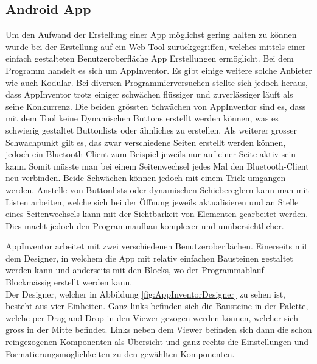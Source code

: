 \subsection{Android App}
\label{subsec:Software_App}

Um den Aufwand der Erstellung einer App möglichst gering halten zu können wurde bei der Erstellung auf ein Web-Tool zurückgegriffen, welches mittels einer einfach gestalteten Benutzeroberfläche App Erstellungen ermöglicht. Bei dem Programm handelt es sich um AppInventor. Es gibt einige weitere solche Anbieter wie auch Kodular. Bei diversen Programmierversuchen stellte sich jedoch heraus, dass AppInventor trotz einiger schwächen flüssiger und zuverlässiger läuft als seine Konkurrenz.  Die beiden grössten Schwächen von AppInventor sind es, dass mit dem Tool keine Dynamischen Buttons erstellt werden können, was es schwierig gestaltet Buttonlists oder ähnliches zu erstellen. Als weiterer grosser Schwachpunkt gilt es, das zwar verschiedene Seiten erstellt werden können, jedoch ein Bluetooth-Client zum Beispiel jeweils nur auf einer Seite aktiv sein kann. Somit müsste man bei einem Seitenwechsel jedes Mal den Bluetooth-Client neu verbinden. Beide Schwächen können jedoch mit einem Trick umgangen werden. Anstelle von Buttonlists oder dynamischen Schiebereglern kann man mit Listen arbeiten, welche sich bei der Öffnung jeweils aktualisieren und an Stelle eines Seitenwechsels kann mit der Sichtbarkeit von Elementen gearbeitet werden. Dies macht jedoch den Programmaufbau komplexer und unübersichtlicher.\\


AppInventor arbeitet mit zwei verschiedenen Benutzeroberflächen. Einerseits mit dem Designer, in welchem die App mit relativ einfachen Bausteinen gestaltet werden kann und anderseits mit den Blocks, wo der Programmablauf Blockmässig erstellt werden kann.\\

Der Designer, welcher in Abbildung \ref{fig:AppInventorDesigner} zu sehen ist, besteht aus vier Einheiten. Ganz links befinden sich die Bausteine in der Palette, welche per Drag and Drop in den Viewer gezogen werden können, welcher sich gross in der Mitte befindet. Links neben dem Viewer befinden sich dann die schon reingezogenen Komponenten als Übersicht und ganz rechts die Einstellungen und Formatierungsmöglichkeiten zu den gewählten Komponenten.

